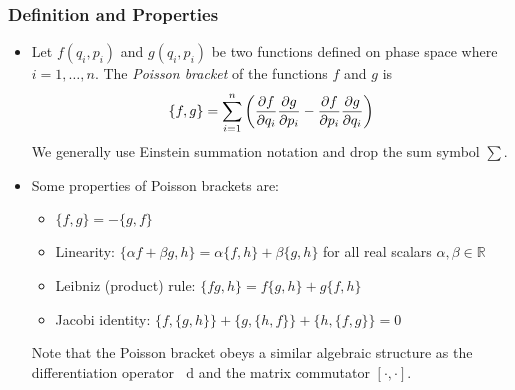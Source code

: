 \documentclass[11pt, a4paper]{article}
\newcommand{\diff}{\mathop{}\!\mathrm{d}} %
\newcommand{\R}{\mathbb{R}} %
\begin{document}
\subsubsection{Definition and Properties}
\begin{itemize}
	\item Let $ f(q_{i}, p_{i}) $ and $ g(q_{i}, p_{i}) $ be two functions defined on phase space where $ i = 1, \ldots, n $. The \textit{Poisson bracket} of the functions $ f $ and $ g $ is 
	\begin{equation*}
		\{f, g\} = \sum_{i=1}^{n}\left(\pdv{f}{q_{i}} \pdv{g}{p_{i}} - \pdv{f}{p_{i}} \pdv{g}{q_{i}}\right)
	\end{equation*}
	We generally use Einstein summation notation and drop the sum symbol $ \sum $.
	
	\item Some properties of Poisson brackets are:
	\begin{itemize}
		\item $ \{f, g\} = - \{g, f\} $
		\item Linearity: $ \{\alpha f + \beta g, h \} = \alpha \{f, h \}  + \beta \{g, h \} $ for all real scalars $ \alpha, \beta \in \R $
		\item Leibniz (product) rule: $ \{fg, h\} = f\{g, h\} + g\{f, h\} $
		\item Jacobi identity: $ \{f, \{g, h\} \} + \{g, \{h, f\} \} + \{h, \{f, g\} \} = 0 $
	\end{itemize}
	Note that the Poisson bracket obeys a similar algebraic structure as the differentiation operator $ \diff $ and the matrix commutator $ [\cdot, \cdot] $.
	

\end{itemize}
\end{document}
